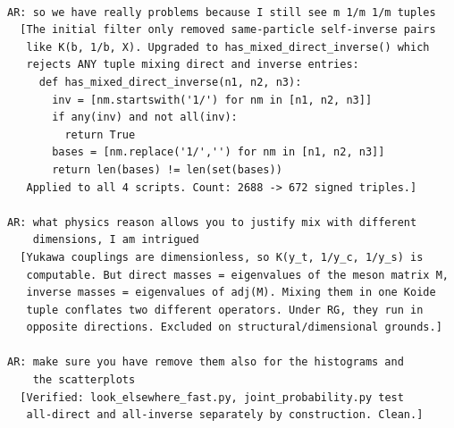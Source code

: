 \documentclass[11pt,a4paper]{article}
\begin{document}
\begin{Verbatim}[fontsize=\footnotesize]
% === SESSION 3: Mixed direct/inverse filter (2026-03-10) ===

AR: so we have really problems because I still see m 1/m 1/m tuples
  [The initial filter only removed same-particle self-inverse pairs
   like K(b, 1/b, X). Upgraded to has_mixed_direct_inverse() which
   rejects ANY tuple mixing direct and inverse entries:
     def has_mixed_direct_inverse(n1, n2, n3):
       inv = [nm.startswith('1/') for nm in [n1, n2, n3]]
       if any(inv) and not all(inv):
         return True
       bases = [nm.replace('1/','') for nm in [n1, n2, n3]]
       return len(bases) != len(set(bases))
   Applied to all 4 scripts. Count: 2688 -> 672 signed triples.]

AR: what physics reason allows you to justify mix with different
    dimensions, I am intrigued
  [Yukawa couplings are dimensionless, so K(y_t, 1/y_c, 1/y_s) is
   computable. But direct masses = eigenvalues of the meson matrix M,
   inverse masses = eigenvalues of adj(M). Mixing them in one Koide
   tuple conflates two different operators. Under RG, they run in
   opposite directions. Excluded on structural/dimensional grounds.]

AR: make sure you have remove them also for the histograms and
    the scatterplots
  [Verified: look_elsewhere_fast.py, joint_probability.py test
   all-direct and all-inverse separately by construction. Clean.]
\end{Verbatim}
\end{document}
